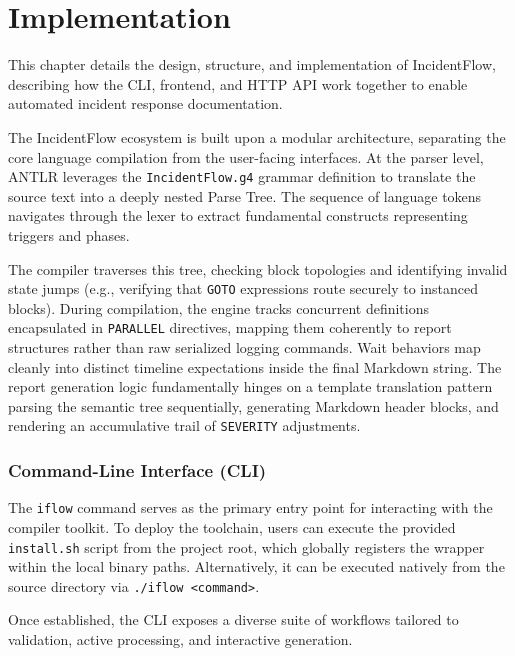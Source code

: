 \chapter*{Implementation}
{}
\label{ch:incidentflow_architecture}

This chapter details the design, structure, and implementation of IncidentFlow, describing how the CLI, frontend, and HTTP API work together to enable automated incident response documentation.

The IncidentFlow ecosystem is built upon a modular architecture, separating the core language compilation from the user-facing interfaces. At the parser level, ANTLR leverages the \texttt{IncidentFlow.g4} grammar definition to translate the source text into a deeply nested Parse Tree. The sequence of language tokens navigates through the lexer to extract fundamental constructs representing triggers and phases. 

The compiler traverses this tree, checking block topologies and identifying invalid state jumps (e.g., verifying that \texttt{GOTO} expressions route securely to instanced blocks). During compilation, the engine tracks concurrent definitions encapsulated in \texttt{PARALLEL} directives, mapping them coherently to report structures rather than raw serialized logging commands. Wait behaviors map cleanly into distinct timeline expectations inside the final Markdown string. The report generation logic fundamentally hinges on a template translation pattern parsing the semantic tree sequentially, generating Markdown header blocks, and rendering an accumulative trail of \texttt{SEVERITY} adjustments.

\subsection{Command-Line Interface (CLI)}
\label{subsec:impl_cli}

The \texttt{iflow} command serves as the primary entry point for interacting with the compiler toolkit. To deploy the toolchain, users can execute the provided \texttt{install.sh} script from the project root, which globally registers the wrapper within the local binary paths. Alternatively, it can be executed natively from the source directory via \texttt{./iflow <command>}.

Once established, the CLI exposes a diverse suite of workflows tailored to validation, active processing, and interactive generation. 

